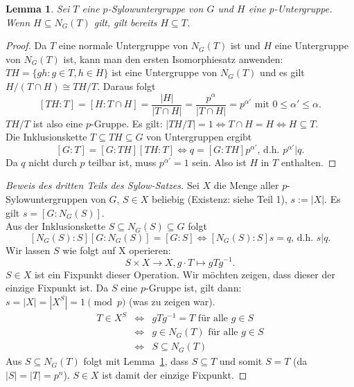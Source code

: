 \documentclass[12pt]{scrartcl}%
\newtheorem{lemma}{Lemma}
\theoremstyle{definition}
\theoremstyle{remark}
\begin{document}
\begin{lemma}\label{lem:Sylow}
	Sei $T$ eine $p$-Sylowuntergruppe von $G$ und $H$ eine $p$-Untergruppe. Wenn $H \subseteq N_G(T)$ gilt, gilt bereits $H \subseteq T$.
\end{lemma}

\begin{proof}
	Da $T$ eine normale Untergruppe von $N_G(T)$ ist und $H$ eine Untergruppe von $N_G(T)$ ist, kann man den ersten Isomorphiesatz anwenden: $TH = \{ gh : g \in T, h \in H \}$ ist eine Untergruppe von $N_G(T)$ und es gilt $H/(T \cap H) \cong TH/T$. Daraus folgt
	$$ [TH : T] = [H : T \cap H] = \frac{|H|}{|T \cap H|} = \frac{p^{\alpha}}{|T \cap H|} = p^{\alpha '} \text{ mit } 0 \leq \alpha ' \leq \alpha.$$
	$TH/T$ ist also eine $p$-Gruppe. Es gilt: $|TH/T| = 1 \Leftrightarrow T \cap H = H \Leftrightarrow H \subseteq T$. \\
	Die Inklusionskette $T \subseteq TH \subseteq G$ von Untergruppen ergibt
	$$[G:T] = [G:TH][TH:T] \Leftrightarrow q = [G:TH]p^{\alpha '} \text{, d.h. } p^{\alpha '} | q.$$
	Da $q$ nicht durch $p$ teilbar ist, muss $p^{\alpha '} = 1$ sein. Also ist $H$ in $T$ enthalten.
\end{proof}

\begin{proof}[Beweis des dritten Teils des Sylow-Satzes]
	Sei $X$ die Menge aller $p$-Sylowuntergruppen von $G$, $S \in X$ beliebig (Existenz: siehe Teil 1), $s := |X|$. Es gilt $s = [G:N_G(S)]$. \\
	Aus der Inklusionskette $S \subseteq N_G(S) \subseteq G$ folgt
	$$[N_G(S):S] [G:N_G(S)] = [G:S] \Leftrightarrow [N_G(S):S] s = q \text{, d.h. } s | q.$$
	Wir lassen $S$ wie folgt auf X operieren:
	$$S \times X \rightarrow X, g \cdot T \mapsto gTg^{-1}.$$
	$S \in X$ ist ein Fixpunkt dieser Operation. Wir möchten zeigen, dass dieser der einzige Fixpunkt ist. Da $S$ eine $p$-Gruppe ist, gilt dann: $s = |X| = |X^S| = 1 \pmod{p}$ (was zu zeigen war).
	\begin{align*}
		T \in X^S &\Leftrightarrow &gTg^{-1} = T \text{ für alle } g \in S \\
		&\Leftrightarrow &g \in N_G(T) \text{ für alle } g \in S \\
		&\Leftrightarrow &S \subseteq N_G(T)
	\end{align*}
	Aus $S \subseteq N_G(T)$ folgt mit Lemma~\ref{lem:Sylow}, dass $S \subseteq T$ und somit $S = T$ (da $|S| = |T| = p^n$). $S \in X$ ist damit der einzige Fixpunkt.
\end{proof}
\end{document}
